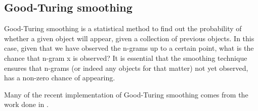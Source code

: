 \subsection{Good-Turing smoothing}
\label{Good-Turing}
Good-Turing smoothing is a statistical method to find out the probability of whether a given object will appear, given a collection of previous objects. In this case, given that we have observed the n-grams up to a certain point, what is the chance that n-gram x is observed? It is essential that the smoothing technique ensures that n-grams (or indeed any objects for that matter) not yet observed, has a non-zero chance of appearing.

Many of the recent implementation of Good-Turing smoothing comes from the work done in \cite{Gale94good-turingsmoothing}.
